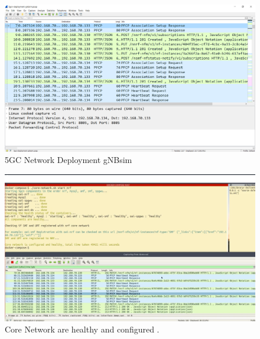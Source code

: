  


\begin{figure}
\centering
\includegraphics[scale=0.18]{images/5gcn-deployment-gnbsim.png}
\caption{5GC Network Deployment gNBsim \cite{openairinterface2014}}
\label{fig:5gcn-deployment-gnbsim}
\end{figure}






\begin{figure}
\centering
\includegraphics[scale=0.18]{images/corenetwork_are_healthy.png}
\caption{Core Network are healthy and configured \cite{openairinterface2014}.}
\label{fig:corenetwork_are_healthy}
\end{figure}


 

 


